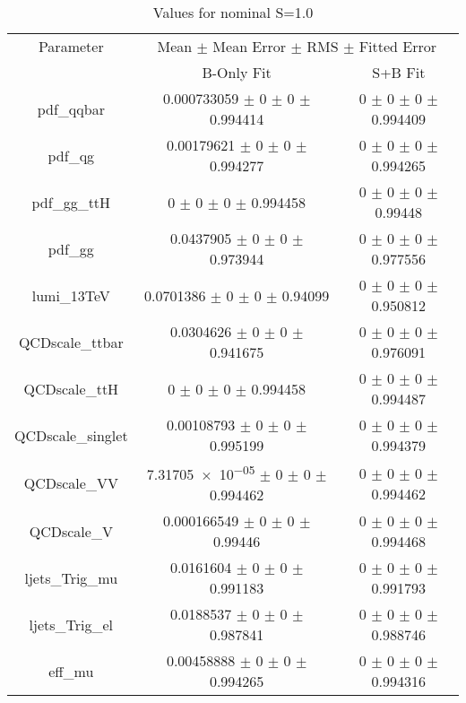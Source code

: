 \begin{table}
\centering
\caption{Values for nominal S=1.0}
\begin{tabular}{ccc}
\toprule
Parameter 	& \multicolumn{2}{c}{Mean $\pm$ Mean Error $\pm$ RMS $\pm$ Fitted Error}\\
 	& B-Only Fit & S+B Fit\\
\midrule
pdf\_qqbar 	& \num{0.000733059} $\pm$ \num{0} $\pm$ \num{0} $\pm$ \num{0.994414} 	& \num{0} $\pm$ \num{0} $\pm$ \num{0} $\pm$ \num{0.994409}\\
pdf\_qg 	& \num{0.00179621} $\pm$ \num{0} $\pm$ \num{0} $\pm$ \num{0.994277} 	& \num{0} $\pm$ \num{0} $\pm$ \num{0} $\pm$ \num{0.994265}\\
pdf\_gg\_ttH 	& \num{0} $\pm$ \num{0} $\pm$ \num{0} $\pm$ \num{0.994458} 	& \num{0} $\pm$ \num{0} $\pm$ \num{0} $\pm$ \num{0.99448}\\
pdf\_gg 	& \num{0.0437905} $\pm$ \num{0} $\pm$ \num{0} $\pm$ \num{0.973944} 	& \num{0} $\pm$ \num{0} $\pm$ \num{0} $\pm$ \num{0.977556}\\
lumi\_13TeV 	& \num{0.0701386} $\pm$ \num{0} $\pm$ \num{0} $\pm$ \num{0.94099} 	& \num{0} $\pm$ \num{0} $\pm$ \num{0} $\pm$ \num{0.950812}\\
QCDscale\_ttbar 	& \num{0.0304626} $\pm$ \num{0} $\pm$ \num{0} $\pm$ \num{0.941675} 	& \num{0} $\pm$ \num{0} $\pm$ \num{0} $\pm$ \num{0.976091}\\
QCDscale\_ttH 	& \num{0} $\pm$ \num{0} $\pm$ \num{0} $\pm$ \num{0.994458} 	& \num{0} $\pm$ \num{0} $\pm$ \num{0} $\pm$ \num{0.994487}\\
QCDscale\_singlet 	& \num{0.00108793} $\pm$ \num{0} $\pm$ \num{0} $\pm$ \num{0.995199} 	& \num{0} $\pm$ \num{0} $\pm$ \num{0} $\pm$ \num{0.994379}\\
QCDscale\_VV 	& \num{7.31705e-05} $\pm$ \num{0} $\pm$ \num{0} $\pm$ \num{0.994462} 	& \num{0} $\pm$ \num{0} $\pm$ \num{0} $\pm$ \num{0.994462}\\
QCDscale\_V 	& \num{0.000166549} $\pm$ \num{0} $\pm$ \num{0} $\pm$ \num{0.99446} 	& \num{0} $\pm$ \num{0} $\pm$ \num{0} $\pm$ \num{0.994468}\\
ljets\_Trig\_mu 	& \num{0.0161604} $\pm$ \num{0} $\pm$ \num{0} $\pm$ \num{0.991183} 	& \num{0} $\pm$ \num{0} $\pm$ \num{0} $\pm$ \num{0.991793}\\
ljets\_Trig\_el 	& \num{0.0188537} $\pm$ \num{0} $\pm$ \num{0} $\pm$ \num{0.987841} 	& \num{0} $\pm$ \num{0} $\pm$ \num{0} $\pm$ \num{0.988746}\\
eff\_mu 	& \num{0.00458888} $\pm$ \num{0} $\pm$ \num{0} $\pm$ \num{0.994265} 	& \num{0} $\pm$ \num{0} $\pm$ \num{0} $\pm$ \num{0.994316}\\

\end{tabular}
\end{table}
